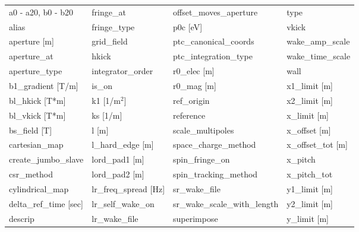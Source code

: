  \begin{tabular}{llll} \toprule
a0 - a20, b0 - b20             & fringe_at                      & offset_moves_aperture          & type                           \\
alias                          & fringe_type                    & p0c [eV]                       & vkick                          \\
aperture [m]                   & grid_field                     & ptc_canonical_coords           & wake_amp_scale                 \\
aperture_at                    & hkick                          & ptc_integration_type           & wake_time_scale                \\
aperture_type                  & integrator_order               & r0_elec [m]                    & wall                           \\
b1_gradient [T/m]              & is_on                          & r0_mag [m]                     & x1_limit [m]                   \\
bl_hkick [T*m]                 & k1 [1/m$^2$]                   & ref_origin                     & x2_limit [m]                   \\
bl_vkick [T*m]                 & ks [1/m]                       & reference                      & x_limit [m]                    \\
bs_field [T]                   & l [m]                          & scale_multipoles               & x_offset [m]                   \\
cartesian_map                  & l_hard_edge [m]                & space_charge_method            & x_offset_tot [m]               \\
create_jumbo_slave             & lord_pad1 [m]                  & spin_fringe_on                 & x_pitch                        \\
csr_method                     & lord_pad2 [m]                  & spin_tracking_method           & x_pitch_tot                    \\
cylindrical_map                & lr_freq_spread [Hz]            & sr_wake_file                   & y1_limit [m]                   \\
delta_ref_time [sec]           & lr_self_wake_on                & sr_wake_scale_with_length      & y2_limit [m]                   \\
descrip                        & lr_wake_file                   & superimpose                    & y_limit [m]                    \\

\end{tabular}

